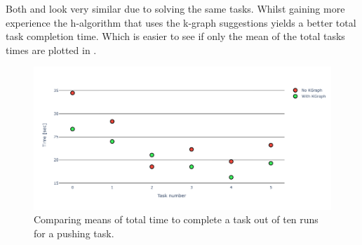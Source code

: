 Both  and  look very similar due to solving the same tasks. Whilst gaining more experience the \ac{h-algorithm} that uses the \ac{k-graph} suggestions yields a better total task completion time. Which is easier to see if only the mean of the total tasks times are plotted in . 

\begin{figure}[H]
    \centering
    \includegraphics[width=\textwidth]{figures/results/random_push_time_vs}
    \caption{Comparing means of total time to complete a task out of ten runs for a pushing task.}\label{fig:random_push_time_vs}
\end{figure}


